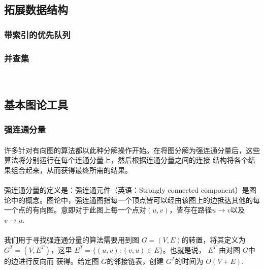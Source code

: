 \documentclass[UTF8,a4paper]{ctexart}
\begin{document}
\subsection{拓展数据结构}
\subsubsection{带索引的优先队列~\cite{algs4}}\label{sec:indexedpq}

\subsubsection{并查集}~\cite{introtoalgo}\label{sec:unionfind}
\paragraph{}

\subsection{基本图论工具}
\subsubsection{强连通分量}\label{sec:scc}
\paragraph{}许多针对有向图的算法都以此种分解操作开始。在将图分解为强连通分量后，这些算法将分别运行在每个连通分量上，然后根据连通分量之间的连接 结构将各个结果组合起来，从而获得最终所需的结果。
\paragraph{}强连通分量的定义是：强连通元件（英语：Strongly connected component）是图论中的概念。图论中，强连通图指每一个顶点皆可以经由该图上的边抵达其他的每一个点的有向图。意即对于此图上每一个点对$(u,v)$，皆存在路径$u\to v$以及$v\to u$.
\paragraph{}我们用于寻找强连通分量的算法需要用到图 $G=(V, E)$的转置，将其定义为 $G^T=(V,E^T)$，这里 $E^T=\{(u, v): (v, u) \in E\}$。也就是说， $E^T$ 由对图 $G$中的边进行反向而 获得。给定图 $G$的邻接链表，创建 $G^T$的时间为 $O(V+E)$.
\end{document}
